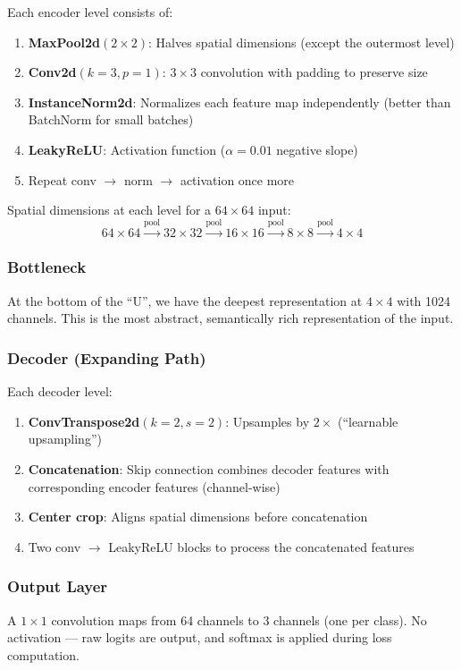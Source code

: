 \documentclass[12pt,a4paper]{report}
\begin{document}
Each encoder level consists of:
\begin{enumerate}
    \item \textbf{MaxPool2d}$(2 \times 2)$: Halves spatial dimensions (except the outermost level)
    \item \textbf{Conv2d}$(k=3, p=1)$: $3 \times 3$ convolution with padding to preserve size
    \item \textbf{InstanceNorm2d}: Normalizes each feature map independently (better than BatchNorm for small batches)
    \item \textbf{LeakyReLU}: Activation function ($\alpha = 0.01$ negative slope)
    \item Repeat conv $\to$ norm $\to$ activation once more
\end{enumerate}

Spatial dimensions at each level for a $64 \times 64$ input:
$$64 \times 64 \xrightarrow{\text{pool}} 32 \times 32 \xrightarrow{\text{pool}} 16 \times 16 \xrightarrow{\text{pool}} 8 \times 8 \xrightarrow{\text{pool}} 4 \times 4$$

\subsubsection{Bottleneck}
At the bottom of the ``U'', we have the deepest representation at $4 \times 4$ with 1024 channels. This is the most abstract, semantically rich representation of the input.

\subsubsection{Decoder (Expanding Path)}
Each decoder level:
\begin{enumerate}
    \item \textbf{ConvTranspose2d}$(k=2, s=2)$: Upsamples by $2\times$ (``learnable upsampling'')
    \item \textbf{Concatenation}: Skip connection combines decoder features with corresponding encoder features (channel-wise)
    \item \textbf{Center crop}: Aligns spatial dimensions before concatenation
    \item Two conv $\to$ LeakyReLU blocks to process the concatenated features
\end{enumerate}

\subsubsection{Output Layer}
A $1 \times 1$ convolution maps from 64 channels to 3 channels (one per class). No activation --- raw logits are output, and softmax is applied during loss computation.
\end{document}
